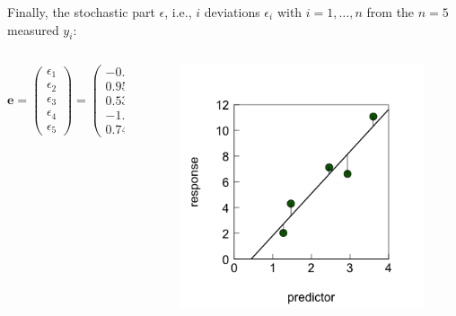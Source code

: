 \documentclass{beamer}
\begin{document}
\begin{frame}
    \frametitle{}
    Finally, the stochastic part $\epsilon$, i.e., $i$ deviations $\epsilon_i$ with $i = 1, \ldots, n$ from the $n = 5$ measured $y_i$:
    \begin{columns}
        \begin{column}{0.44\textwidth}
    \begin{equation*}
        \mathbf{e} = \left( \begin{array}{c} \epsilon_1 \\ \epsilon_2 \\ \epsilon_3 \\ \epsilon_4 \\ \epsilon_5 \end{array}\right) = \left( \begin{array}{c} -0.69 \\ 0.95 \\ 0.53 \\ -1.53 \\ 0.74 \end{array}\right)
    \end{equation*}
    \end{column}
    \begin{column}{0.44\textwidth}
    \begin{figure}[h]
        \centering
        \includegraphics[width=0.999\textwidth]{lectures/day_2_LM_refresh_I/figures/unnamed-chunk-15-1.png}
    \end{figure}
    \end{column}
    \end{columns}
\end{frame}
\end{document}
